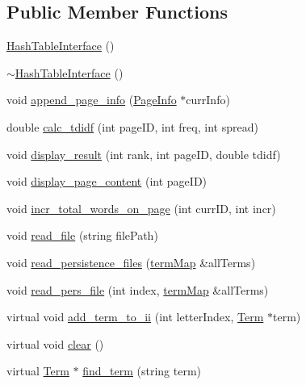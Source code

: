 \subsection*{Public Member Functions}
\begin{DoxyCompactItemize}
\item 
\hyperlink{class_hash_table_interface_afcc090bbeda66c331a7a28623aad5d0c}{Hash\+Table\+Interface} ()
\item 
\hyperlink{class_hash_table_interface_ab0a34d3f1ee275590002fc4c5d4327fe}{$\sim$\+Hash\+Table\+Interface} ()
\item 
void \hyperlink{class_index_interface_a7f082789ce91eaaacc10a5c841b62cd4}{append\+\_\+page\+\_\+info} (\hyperlink{class_page_info}{Page\+Info} $\ast$curr\+Info)
\item 
double \hyperlink{class_index_interface_a8195aee88cd593c2e6ca2e2c48cbd068}{calc\+\_\+tdidf} (int page\+I\+D, int freq, int spread)
\item 
void \hyperlink{class_index_interface_a7e4d5fe8c31cfc9aa02c2dd1d7e1d3aa}{display\+\_\+result} (int rank, int page\+I\+D, double tdidf)
\item 
void \hyperlink{class_index_interface_a3d784385e028557312ef15d59574f9ed}{display\+\_\+page\+\_\+content} (int page\+I\+D)
\item 
void \hyperlink{class_index_interface_a5734b1488a787d47984bf97ffa5aff8d}{incr\+\_\+total\+\_\+words\+\_\+on\+\_\+page} (int curr\+I\+D, int incr)
\item 
void \hyperlink{class_index_interface_a229f1eb93f38d85d78e64e579c46c98a}{read\+\_\+file} (string file\+Path)
\item 
void \hyperlink{class_index_interface_aa6ef58f8b651083175b684b9428a90c5}{read\+\_\+persistence\+\_\+files} (\hyperlink{docparser_8h_a9b942645c404d380838be4078b0199d9}{term\+Map} \&all\+Terms)
\item 
void \hyperlink{class_index_interface_adcba07c90cd34ab0ce7bee340d09ed07}{read\+\_\+pers\+\_\+file} (int index, \hyperlink{docparser_8h_a9b942645c404d380838be4078b0199d9}{term\+Map} \&all\+Terms)
\item 
virtual void \hyperlink{class_index_interface_aa83b7083d107869e3519c5862bc71d0a}{add\+\_\+term\+\_\+to\+\_\+ii} (int letter\+Index, \hyperlink{class_term}{Term} $\ast$term)
\item 
virtual void \hyperlink{class_index_interface_ad7b88501f360ccfad0c1ee08d793ca25}{clear} ()
\item 
virtual \hyperlink{class_term}{Term} $\ast$ \hyperlink{class_index_interface_a851f0396f0b390cc9aa8cde270afffc9}{find\+\_\+term} (string term)

\end{DoxyCompactItemize}
